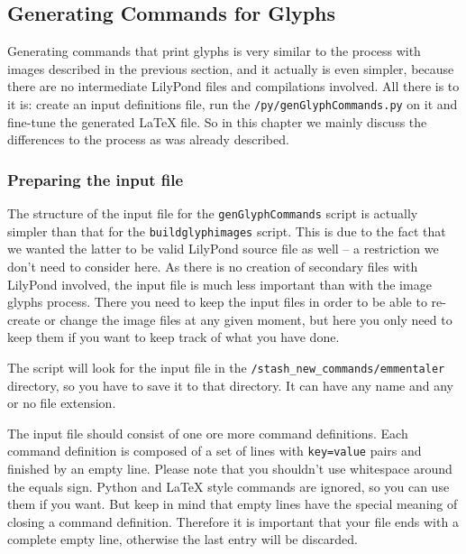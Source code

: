 \documentclass{article}
\begin{document}
\subsection{Generating Commands for \emmentaler Glyphs}
\label{subsec:generating_commands_emmentaler}

Generating commands that print \emmentaler glyphs is very similar to the process with images described in the previous section, and it actually is even simpler, because there are no intermediate LilyPond files and compilations involved.
All there is to it is: create an input definitions file, run the \texttt{/py/genGlyphCommands.py} on it and fine-tune the generated \LaTeX{} file.
So in this chapter we mainly discuss the differences to the process as was already described.


\subsubsection{Preparing the input file}
\label{subsubsec:GGC_preparing_input_file}

The structure of the input file for the \texttt{genGlyphCommands} script is actually simpler than that for the \texttt{buildglyphimages} script.
This is due to the fact that we wanted the latter to be valid LilyPond source file as well -- a restriction we don't need to consider here.
As there is no creation of secondary files with LilyPond involved, the input file is much less important than with the image glyphs process.
There you need to keep the input files in order to be able to re-create or change the image files at any given moment, but here you only need to keep them if you want to keep track of what you have done.

The script will look for the input file in the \texttt{/stash\_new\_commands/emmentaler} directory, so you have to save it to that directory.
It can have any name and any or no file extension.

The input file should consist of one ore more command definitions.
Each command definition is composed of a set of lines with \texttt{key=value} pairs and finished by an empty line.
Please note that you shouldn't use whitespace around the equals sign.
Python and \LaTeX{} style commands are ignored, so you can use them if you want.
But keep in mind that empty lines have the special meaning of closing a command definition.
Therefore it is important that your file ends with a complete empty line, otherwise the last entry will be discarded.
\end{document}
